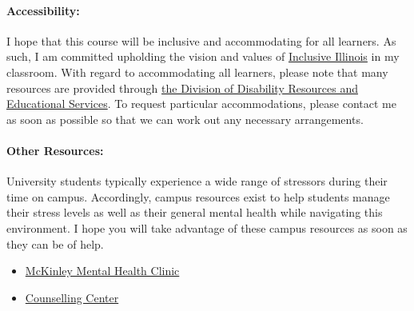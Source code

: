 \documentclass[11pt, a4paper]{article}
\begin{document}
\paragraph{Accessibility:} I hope that this course will be inclusive and 
accommodating for all learners. As such, I am committed upholding the vision 
and values of \href{http://www.inclusiveillinois.illinois.edu/index.html}{Inclusive Illinois}
in my 
classroom.  With regard to accommodating all learners, please note that many 
resources are provided through 
\href{http://disability.illinois.edu/academic-support/accommodations}{the 
Division of Disability Resources and Educational Services}.  To request 
particular accommodations, please contact me as soon as possible so that we can 
work out any necessary arrangements.

\paragraph{Other Resources:} 
University students typically experience a wide range of stressors during their 
time on campus. Accordingly, campus resources exist to help students manage their 
stress levels as well as their general mental health while navigating this environment. I 
hope you will take advantage of these campus resources as soon as they can be 
of help.

\begin{itemize}
\item \href{http://www.mckinley.illinois.edu/clinics/mental\_health.htm}{McKinley Mental Health Clinic}
\item \href{http://counselingcenter.illinois.edu/}{Counselling Center}
\end{itemize}
\end{document}
